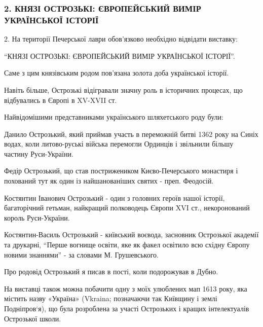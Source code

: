  
 
 
 
 
\subsubsection{2. КНЯЗІ ОСТРОЗЬКІ: ЄВРОПЕЙСЬКИЙ ВИМІР УКРАЇНСЬКОЇ ІСТОРІЇ}
\label{sec:28_01_2022.fb.fb_group.story_kiev_ua.1.kiev_visim_sekretiv.2.knjazi_ostrozki}

2. На території Печерської лаври обов’язково необхідно відвідати виставку:

\enquote{КНЯЗІ ОСТРОЗЬКІ: ЄВРОПЕЙСЬКИЙ ВИМІР УКРАЇНСЬКОЇ ІСТОРІЇ}.

Саме з цим князівським родом пов’язана золота доба української історії. 

Навіть більше, Острозькі відігравали значну роль в історичних процесах, що
відбувались в Європі в XV-XVII ст. 

Найвідомішими представниками українського шляхетського роду були:

Данило Острозький, який приймав участь в переможній битві 1362 року на Синіх
водах, коли литово-руські війська перемогли Ординців і звільнили більшу частину
Руси-України.

Федір Острозький, що став пострижеником Києво-Печерського монастиря і похований
тут як один із найшанованіших святих - преп. Феодосій.


Костянтин Іванович Острозький - один з головних героїв нашої історії,
багаторічний гетьман, найкращий полководець Європи XVI ст., некоронований
король Руси-України.

Костянтин-Василь Острозький - київський воєвода, засновник Острозької академії
та друкарні, \enquote{Перше вогнище освіти, яке як факел освітило всю східну
Європу новими знаннями} - за словами М. Грушевського.  

Про родовід Острозький я писав в пості, коли подорожував в Дубно.

На виставці також можна побачити одну з моїх улюблених мап 1613 року, яка
містить назву «Україна» (Vkraina; позначаючи так Київщину і землі Подніпров‘я),
що була розроблена за участі Острозьких і кращих інтелектуалів Острозької
школи.

